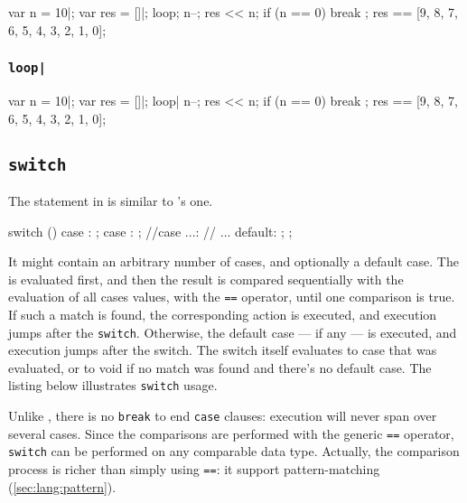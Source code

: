 \begin{urbiassert}
{
  var n = 10|;
  var res = []|;
  loop;
  {
    n--;
    res << n;
    if (n == 0)
      break
  };
  res
}
==
[9, 8, 7, 6, 5, 4, 3, 2, 1, 0];
\end{urbiassert}

\subsubsection{\lstinline{loop|}}
\label{sec:lang:loop:pipe}

\begin{urbiassert}
{
  var n = 10|;
  var res = []|;
  loop|
  {
    n--;
    res << n;
    if (n == 0)
      break
  };
  res
}
==
[9, 8, 7, 6, 5, 4, 3, 2, 1, 0];
\end{urbiassert}

\subsection{\lstinline{switch}}
\label{sec:lang:switch}

The  statement in \us is similar to \langC's one.

\begin{urbiunchecked}
switch ()
{
  case :
    ;
  case :
    ;
//case ...:
//  ...
  default:
    ;
};
\end{urbiunchecked}

It might contain an arbitrary number of cases, and optionally a default
case. The  is evaluated first, and then the result is compared
sequentially with the evaluation of all cases values, with the
\lstinline|==| operator, until one comparison is true.  If such a match is
found, the corresponding action is executed, and execution jumps after the
\lstinline{switch}. Otherwise, the default case --- if any --- is executed,
and execution jumps after the switch. The switch itself evaluates to case
that was evaluated, or to void if no match was found and there's no default
case. The listing below illustrates \lstinline{switch} usage.

Unlike \langC, there is no \lstinline{break} to end \lstinline{case} clauses:
execution will never span over several cases.  Since the comparisons are
performed with the generic \lstinline|==| operator, \lstinline{switch} can
be performed on any comparable data type.  Actually, the comparison process
is richer than simply using \lstinline|==|: it support pattern-matching
(\autoref{sec:lang:pattern}).

